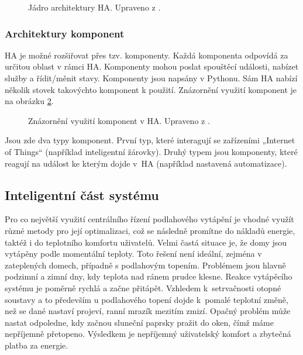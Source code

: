 \begin{figure}[H]
    \centering
    \def\svgwidth{\columnwidth}
    
    \caption[Jádro architektury HA.]{Jádro architektury HA. Upraveno z \cite{home-assistant-architektura}.}
    \label{fig:ha-jadro-architektury}
\end{figure}

\subsubsection{Architektury komponent}
HA je možné rozšiřovat přes tzv. komponenty. Každá komponenta odpovídá za určitou oblast v rámci HA. Komponenty mohou poslat spouštěcí události, nabízet služby a řídit/měnit stavy. Komponenty jsou napsány v Pythonu. Sám HA nabízí několik stovek takovýchto komponent k použití. Znázornění využití komponent je na obrázku \ref{fig:ha-architektura-komponent}.

\begin{figure}[H]
    \centering
    \def\svgwidth{\columnwidth}
    
    \caption[Znázornění využití komponent v~HA.]{Znázornění využití komponent v HA. Upraveno z \cite{home-assistant-architektura}.}
    \label{fig:ha-architektura-komponent}
\end{figure}

Jsou zde dva typy komponent. První typ, které interagují se zařízeními „Internet of Things“ (například inteligentní žárovky). Druhý typem jsou komponenty, které reagují na událost ke kterým dojde v~HA (například nastavená automatizace).


\subsection{Inteligentní část systému}
Pro co největší využití centrálního řízení podlahového vytápění je vhodné využít různé metody pro její optimalizaci, což se následně promítne do nákladů energie, taktéž i do teplotního komfortu uživatelů. Velmi častá situace je, že domy jsou vytápěny podle momentální teploty. Toto řešení není ideální, zejména v zateplených domech, případně s podlahovým topením. Problémem jsou hlavně podzimní a zimní dny, kdy teplota nad ránem prudce klesne. Reakce vytápěcího systému je poměrně rychlá a začne přitápět. Vzhledem k~setrvačnosti otopné soustavy a to především u podlahového topení dojde k~pomalé teplotní změně, než se dané nastaví projeví, ranní mrazík mezitím zmizí. Opačný problém může nastat odpoledne, kdy začnou sluneční paprsky pražit do oken, čímž máme nepříjemně přetopeno. Výsledkem je nepříjemný uživatelský komfort a zbytečná platba za energie.

